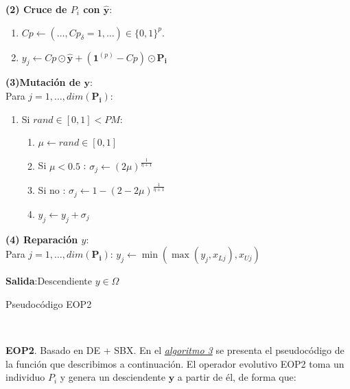 \begin{minipage}{\textwidth}
\begin{algorithm}[H]
\begin{multicols}{2}
     \vspace{0.2cm} \textbf{(2) Cruce de $P_i$ con $\boldsymbol{\hat{y}}$}: 
            \begin{enumerate}
                \item $Cp \gets (\dots,  Cp_\delta=1, \dots) \in \{0,1\}^{p}$.
                \item $y_j \gets Cp \odot \boldsymbol{\hat{y}} +  (\boldsymbol{1}^{(p)} - Cp) \odot \boldsymbol{P_i}
                 $
            \end{enumerate}
            \columnbreak
    
    \vspace{0.2cm} \textbf{(3)Mutación de $\boldsymbol{y}$}:\\ 
    
    Para $j = 1, \dots, dim(\boldsymbol{P_i})$:\\
            \begin{enumerate}
                \item Si $rand \in [0,1] < PM $: 
                \begin{enumerate}
                    \item $\mu \gets rand \in [0,1] $
                    \item Si $\mu < 0.5$ : $\sigma_j \gets (2 \mu)^{\frac{1}{\eta+1}}$
                    \item Si no : $\sigma_j \gets 1 -  (2 - 2 \mu)^{\frac{1}{\eta+1}}$
                    \item $y_j \gets y_j + \sigma_j$ 
                \end{enumerate}
            \end{enumerate}
    
    \end{multicols}
    
    \textbf{(4) Reparación $y$}: \\
            Para $j = 1, \dots, dim(\boldsymbol{P_i})$: $y_j \gets \min ( \max ( y_j , x_{Lj}), x_{Uj})$ 
       
         \vspace{0.2cm}\textbf{Salida}:Descendiente $y \in \Omega$
     \caption{Pseudocódigo EOP2}
     \label{alg:3}
    \end{algorithm}
    \end{minipage}\\  \vspace{0.2cm}


\noindent\textbf{EOP2}. Basado en DE + SBX. En el \hyperref[alg:3]{\textit{algoritmo 3}} se presenta el pseudocódigo de la función que describimos a continuación. El operador evolutivo EOP2 toma un individuo $P_i$ y genera un desciendente $\boldsymbol{y}$ a partir de él, de forma que:\\
    
